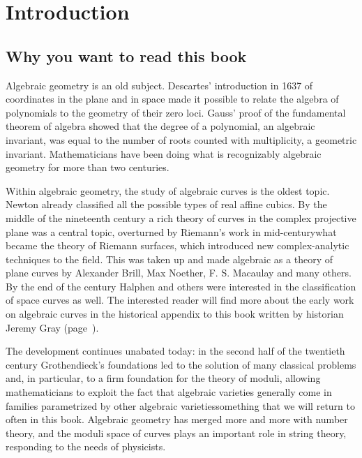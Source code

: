 
\chapter*{Introduction}
\label{IntroChapter}

\section*{Why you want to read this book}

Algebraic geometry is an old subject. 
%
Descartes'
%
introduction in 1637 of coordinates in the plane and in space made it
possible to relate the algebra of polynomials to the geometry of their
zero loci. 
Gauss' 
%
proof of the 
fundamental theorem of algebra
%
showed
that the degree of a polynomial, an algebraic invariant, was equal to
the number of roots counted with multiplicity, a geometric invariant.
Mathematicians have been doing what is recognizably algebraic geometry
for more than two centuries.

Within algebraic geometry, the study of algebraic curves is the oldest topic. Newton already classified all the possible types of real affine cubics. By the middle of
%
%
%
the 
nineteenth
century a rich theory of curves in the complex projective plane was a
central topic, overturned by Riemann's work in mid-century\emdash what
became the theory of Riemann surfaces, which introduced new 
complex-analytic techniques
to the field. This was  taken up and made
algebraic as a theory of plane curves by Alexander Brill, Max Noether,
F. S. Macaulay and many others. By the end of the century 
Halphen
and
others were interested in the classification of space curves as well.
The interested reader will find more about the 
%
early work on algebraic curves in the 
historical appendix to this book
written by historian Jeremy Gray
(page~\pageref{Appendix-History}).

The development continues unabated today: in the second half of the
twentieth 
century 
%
Grothendieck's
foundations led to the solution of many
classical problems and, in particular, to a firm foundation for the
theory of moduli, allowing mathematicians to exploit the fact that
algebraic varieties generally come in families parametrized by other
algebraic varieties\emdash something that we will return to often in
this book. Algebraic geometry has merged more and more with number
theory, and the moduli space of curves plays an important role in
string theory, responding to the needs of physicists.

